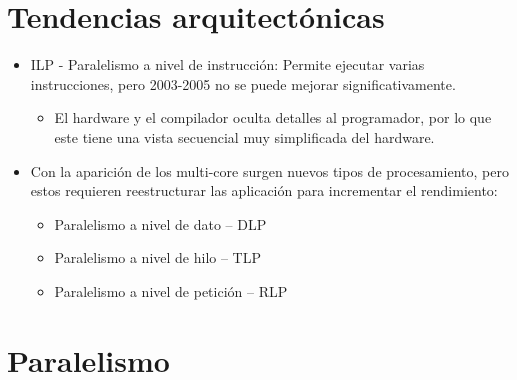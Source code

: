 \documentclass[12pt, twoside, openright]{report} %
\begin{document}
  \section{Tendencias arquitectónicas}

  \begin{itemize}
  
  \item ILP - Paralelismo a nivel de instrucción: Permite ejecutar varias
    instrucciones, pero 2003-2005 no se puede mejorar
    significativamente.

    \begin{itemize}
    
    \item
      El hardware y el compilador oculta detalles al programador, por lo
      que este tiene una vista secuencial muy simplificada del hardware.
    \end{itemize}
  \item
    Con la aparición de los multi-core surgen nuevos tipos de
    procesamiento, pero estos requieren reestructurar las aplicación
    para incrementar el rendimiento:

    \begin{itemize}
    
    \item
      Paralelismo a nivel de dato -- DLP
    \item
      Paralelismo a nivel de hilo -- TLP
    \item
      Paralelismo a nivel de petición -- RLP
    \end{itemize}
  \end{itemize}

  \section{Paralelismo}
\end{document}

